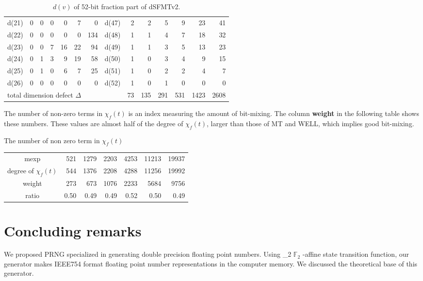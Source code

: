 \documentclass{svmult}
\def\bbf2{\ifmmode \mathbb{F}_2 \else $\mathbb{F}_2$ \fi}
\begin{document}
\begin{table}
\begin{center}
\begin{tabular}{|r|rrrrrr||r|rrrrrr|}
      d(21) & 0 & 0 & 0 & 0 & 7 & 0 & d(47) & 2 & 2 & 5 & 9 & 23 & 41 \\
      d(22) & 0 & 0 & 0 & 0 & 0 & 134 & d(48) & 1 & 1 & 4 & 7 & 18 & 32 \\
      d(23) & 0 & 0 & 7 & 16 & 22 & 94 & d(49) & 1 & 1 & 3 & 5 & 13 & 23 \\
      d(24) & 0 & 1 & 3 & 9 & 19 & 58 & d(50) & 1 & 0 & 3 & 4 & 9 & 15 \\
      d(25) & 0 & 1 & 0 & 6 & 7 & 25 & d(51) & 1 & 0 & 2 & 2 & 4 & 7 \\
      d(26) & 0 & 0 & 0 & 0 & 0 & 0 & d(52) & 1 & 0 & 1 & 0 & 0 & 0 \\ \hline
      \multicolumn{8}{|l|}{total dimension defect $\Delta$} 
      & 73 & 135 & 291 & 531 & 1423 & 2608 \\ \hline
    \end{tabular}
  \end{center}
  \caption{$d(v)$ of 52-bit fraction part of dSFMTv2.}
  \label{tab:dd}
\end{table}

\begin{remark}
  The number of non-zero terms in $\chi_f(t)$ is an index measuring
  the amount of bit-mixing.  The column \textbf{weight} in the 
  following table shows these numbers. These values are almost
  half of the degree of $\chi_f(t)$, larger than those of MT
  and WELL, which implies good bit-mixing.
\end{remark}

\begin{center}
  The number of non zero term in $\chi_f(t)$
  \begin{tabular}{c|rrrrrr} \hline
    mexp & 521 & 1279 & 2203 & 4253 & 11213 & 19937 \\
    degree of $\chi_f(t)$ & 544 & 1376 & 2208 & 4288 & 11256 & 19992 \\
    weight & 273 & 673 & 1076 & 2233 & 5684 & 9756 \\ 
    ratio & 0.50 & 0.49 & 0.49 & 0.52 & 0.50 & 0.49 \\ \hline
  \end{tabular}
\end{center}
\section{Concluding remarks}

We proposed PRNG specialized in generating double precision
floating point numbers. Using \bbf2-affine state transition
function, our generator makes IEEE754 format floating point number
representations in the computer
memory. We discussed the theoretical base of this generator.
\end{document}
